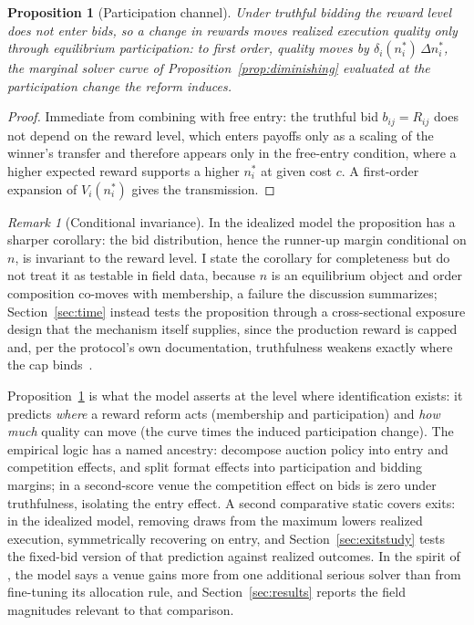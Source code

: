 \documentclass[11pt]{article}
\theoremstyle{plain}
\newtheorem{proposition}{Proposition}
\theoremstyle{definition}
\theoremstyle{remark}
\newtheorem{remark}{Remark}
\begin{document}
\begin{proposition}[Participation channel]\label{prop:neutrality}
Under truthful bidding the reward level does not enter bids, so a change in rewards moves realized execution quality only through equilibrium participation: to first order, quality moves by $\delta_i(n^\ast_i)\,\Delta n^\ast_i$, the marginal solver curve of Proposition~\ref{prop:diminishing} evaluated at the participation change the reform induces.
\end{proposition}

\begin{proof}
Immediate from combining \citet{vickrey1961counterspeculation} with free entry: the truthful bid $b_{ij} = R_{ij}$ does not depend on the reward level, which enters payoffs only as a scaling of the winner's transfer and therefore appears only in the free-entry condition, where a higher expected reward supports a higher $n^\ast_i$ at given cost $c$. A first-order expansion of $V_i(n^\ast_i)$ gives the transmission.
\end{proof}

\begin{remark}[Conditional invariance]\label{rem:invariance}
In the idealized model the proposition has a sharper corollary: the bid distribution, hence the runner-up margin conditional on $n$, is invariant to the reward level. I state the corollary for completeness but do not treat it as testable in field data, because $n$ is an equilibrium object and order composition co-moves with membership, a failure the discussion summarizes; Section~\ref{sec:time} instead tests the proposition through a cross-sectional exposure design that the mechanism itself supplies, since the production reward is capped and, per the protocol's own documentation, truthfulness weakens exactly where the cap binds~\citep{cowdao_rewards}.
\end{remark}

Proposition~\ref{prop:neutrality} is what the model asserts at the level where identification exists: it predicts \emph{where} a reward reform acts (membership and participation) and \emph{how much} quality can move (the curve times the induced participation change). The empirical logic has a named ancestry: \citet{li2009entry} decompose auction policy into entry and competition effects, and \citet{athey2011open} split format effects into participation and bidding margins; in a second-score venue the competition effect on bids is zero under truthfulness, isolating the entry effect. A second comparative static covers exits: in the idealized model, removing draws from the maximum lowers realized execution, symmetrically recovering on entry, and Section~\ref{sec:exitstudy} tests the fixed-bid version of that prediction against realized outcomes. In the spirit of \citet{bulow1996auctions}, the model says a venue gains more from one additional serious solver than from fine-tuning its allocation rule, and Section~\ref{sec:results} reports the field magnitudes relevant to that comparison.
\end{document}
